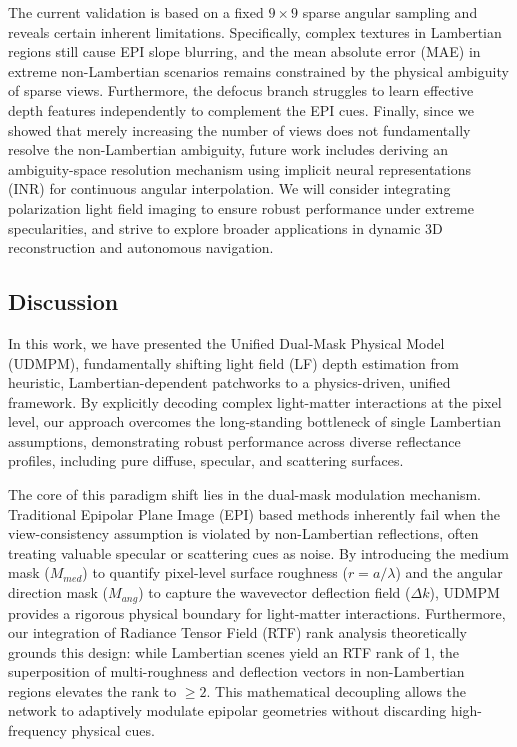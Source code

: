 The current validation is based on a fixed $9 \times 9$ sparse angular sampling and reveals certain inherent limitations. Specifically, complex textures in Lambertian regions still cause EPI slope blurring, and the mean absolute error (MAE) in extreme non-Lambertian scenarios remains constrained by the physical ambiguity of sparse views. Furthermore, the defocus branch struggles to learn effective depth features independently to complement the EPI cues. Finally, since we showed that merely increasing the number of views does not fundamentally resolve the non-Lambertian ambiguity, future work includes deriving an ambiguity-space resolution mechanism using implicit neural representations (INR) for continuous angular interpolation. We will consider integrating polarization light field imaging to ensure robust performance under extreme specularities, and strive to explore broader applications in dynamic 3D reconstruction and autonomous navigation.


\subsection{Discussion}

In this work, we have presented the Unified Dual-Mask Physical Model (UDMPM), fundamentally shifting light field (LF) depth estimation from heuristic, Lambertian-dependent patchworks to a physics-driven, unified framework. By explicitly decoding complex light-matter interactions at the pixel level, our approach overcomes the long-standing bottleneck of single Lambertian assumptions, demonstrating robust performance across diverse reflectance profiles, including pure diffuse, specular, and scattering surfaces.

The core of this paradigm shift lies in the dual-mask modulation mechanism. Traditional Epipolar Plane Image (EPI) based methods inherently fail when the view-consistency assumption is violated by non-Lambertian reflections, often treating valuable specular or scattering cues as noise. By introducing the medium mask ($M_{med}$) to quantify pixel-level surface roughness ($r = a/\lambda$) and the angular direction mask ($M_{ang}$) to capture the wavevector deflection field ($\Delta k$), UDMPM provides a rigorous physical boundary for light-matter interactions. Furthermore, our integration of Radiance Tensor Field (RTF) rank analysis theoretically grounds this design: while Lambertian scenes yield an RTF rank of 1, the superposition of multi-roughness and deflection vectors in non-Lambertian regions elevates the rank to $\ge 2$. This mathematical decoupling allows the network to adaptively modulate epipolar geometries without discarding high-frequency physical cues.

